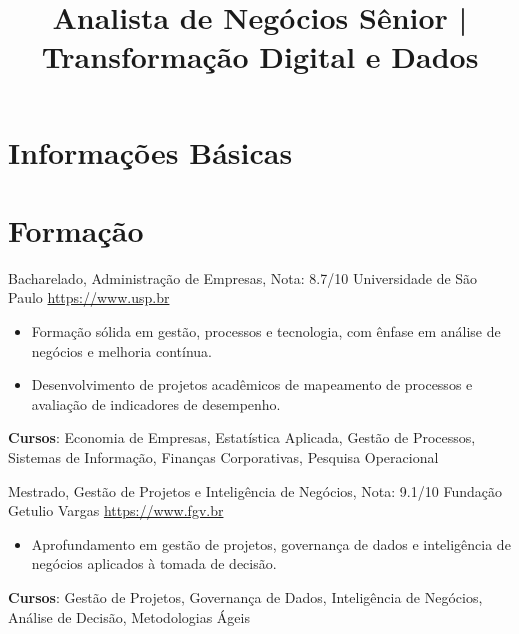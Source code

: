 \documentclass[a4paper, serif, 10pt]{moderncv}
\title{Analista de Negócios Sênior | Transformação Digital e Dados}
\begin{document}
\maketitle

\section{Informações Básicas}

\section{Formação}

        {Bacharelado, Administração de Empresas, Nota: 8.7/10}
        {Universidade de São Paulo}
        {\url{https://www.usp.br}}
        {}
        {\begin{itemize}
\item Formação sólida em gestão, processos e tecnologia, com ênfase em análise de negócios e melhoria contínua.
\item Desenvolvimento de projetos acadêmicos de mapeamento de processos e avaliação de indicadores de desempenho.
\end{itemize}
\textbf{Cursos}: Economia de Empresas, Estatística Aplicada, Gestão de Processos, Sistemas de Informação, Finanças Corporativas, Pesquisa Operacional}

        {Mestrado, Gestão de Projetos e Inteligência de Negócios, Nota: 9.1/10}
        {Fundação Getulio Vargas}
        {\url{https://www.fgv.br}}
        {}
        {\begin{itemize}
\item Aprofundamento em gestão de projetos, governança de dados e inteligência de negócios aplicados à tomada de decisão.
\end{itemize}
\textbf{Cursos}: Gestão de Projetos, Governança de Dados, Inteligência de Negócios, Análise de Decisão, Metodologias Ágeis}
\end{document}
